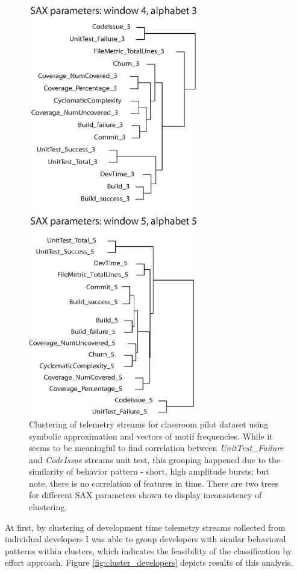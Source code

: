 \documentclass{sig-alternate}
\begin{document}
\begin{figure}[tp]
   \centering
   \includegraphics[height=180mm]{streams_clustering.eps}
   \caption{Clustering of telemetry streams for classroom pilot dataset using symbolic approximation and vectors of motif frequencies. While it seems to be meaningful to find correlation between \textit{UnitTest\_Failure} and \textit{CodeIssue} streams unit test, this grouping happened due to the similarity of behavior pattern - short, high amplitude bursts; but note, there is no correlation of features in time. There are two trees for different SAX parameters shown to display inconsistency of clustering.}
   \label{fig:cluster_streams}
\end{figure}

At first, by clustering of development time telemetry streams collected from individual developers I was able to group developers with similar behavioral patterns within clusters, which indicates the feasibility of the classification by effort approach. Figure \ref{fig:cluster_developers} depicts results of this analysis.
\end{document}
